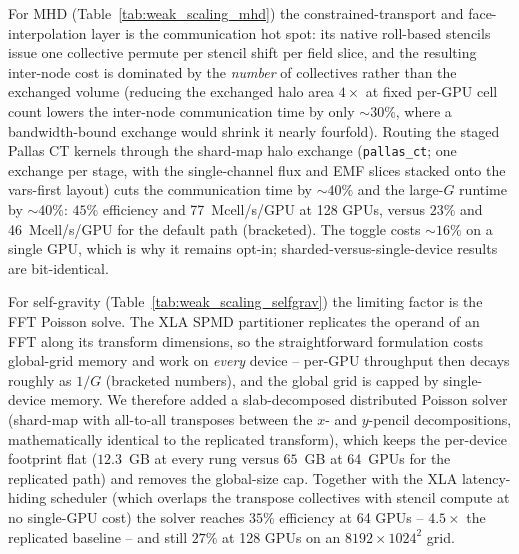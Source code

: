 For MHD (Table~\ref{tab:weak_scaling_mhd}) the constrained-transport and
face-interpolation layer is the communication hot spot: its native
roll-based stencils issue one collective permute per stencil shift per
field slice, and the resulting inter-node cost is dominated by the
\emph{number} of collectives rather than the exchanged volume (reducing
the exchanged halo area $4\times$ at fixed per-GPU cell count lowers the
inter-node communication time by only $\sim\!30\%$, where a
bandwidth-bound exchange would shrink it nearly fourfold).  Routing the staged Pallas CT kernels
through the shard-map halo exchange (\texttt{pallas\_ct}; one exchange
per stage, with the single-channel flux and EMF slices stacked onto the
vars-first layout) cuts the communication time by $\sim\!40\%$ and the
large-$G$ runtime by $\sim\!40\%$: $45\%$ efficiency and
77~Mcell/s/GPU at 128 GPUs, versus $23\%$ and 46~Mcell/s/GPU for the
default path (bracketed).  The toggle costs $\sim\!16\%$ on a single
GPU, which is why it remains opt-in; sharded-versus-single-device
results are bit-identical.

For self-gravity (Table~\ref{tab:weak_scaling_selfgrav}) the limiting
factor is the FFT Poisson solve.  The XLA SPMD partitioner replicates the
operand of an FFT along its transform dimensions, so the straightforward
formulation costs global-grid memory and work on \emph{every} device --
per-GPU throughput then decays roughly as $1/G$ (bracketed numbers), and
the global grid is capped by single-device memory.  We therefore added a
slab-decomposed distributed Poisson solver (shard-map with all-to-all
transposes between the $x$- and $y$-pencil decompositions, mathematically
identical to the replicated transform), which keeps the per-device
footprint flat ($12.3$~GB at every rung versus $65$~GB at 64~GPUs for the
replicated path) and removes the global-size cap.  Together with the XLA
latency-hiding scheduler (which overlaps the transpose collectives with
stencil compute at no single-GPU cost) the solver reaches $35\%$
efficiency at 64 GPUs -- $4.5\times$ the replicated baseline -- and still
$27\%$ at 128 GPUs on an $8192\times1024^{2}$ grid.
